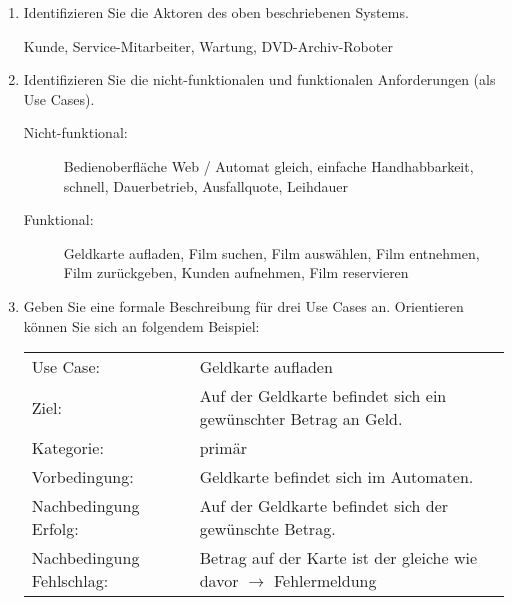 \documentclass{bschlangaul-aufgabe}
\begin{document}
\begin{enumerate}


\item Identifizieren Sie die Aktoren des oben beschriebenen Systems.

\begin{bAntwort}
Kunde, Service-Mitarbeiter, Wartung, DVD-Archiv-Roboter
\end{bAntwort}


\item Identifizieren Sie die nicht-funktionalen und funktionalen Anforderungen (als Use Cases).

\begin{bAntwort}
\begin{description}
\item[Nicht-funktional:] Bedienoberfläche Web / Automat gleich, einfache
Handhabbarkeit, schnell, Dauerbetrieb, Ausfallquote, Leihdauer

\item[Funktional:] Geldkarte aufladen, Film suchen, Film auswählen, Film
entnehmen, Film zurückgeben, Kunden aufnehmen, Film reservieren
\end{description}
\end{bAntwort}

\item Geben Sie eine formale Beschreibung für drei Use Cases an.
Orientieren können Sie sich an folgendem Beispiel:

\begin{bAntwort}

\begin{tabularx}{\linewidth}{p{3cm}X}
Use Case: &
Geldkarte aufladen \\

Ziel: &
Auf der Geldkarte befindet sich ein gewünschter Betrag an Geld. \\

Kategorie: & primär \\

Vorbedingung: & Geldkarte befindet sich im Automaten. \\

Nachbedingung Erfolg: &
Auf der Geldkarte befindet sich der gewünschte Betrag. \\

Nachbedingung Fehlschlag: &
Betrag auf der Karte ist der gleiche wie davor  $\rightarrow$
Fehlermeldung \\


\end{tabularx}
\end{bAntwort}
\end{enumerate}
\end{document}
